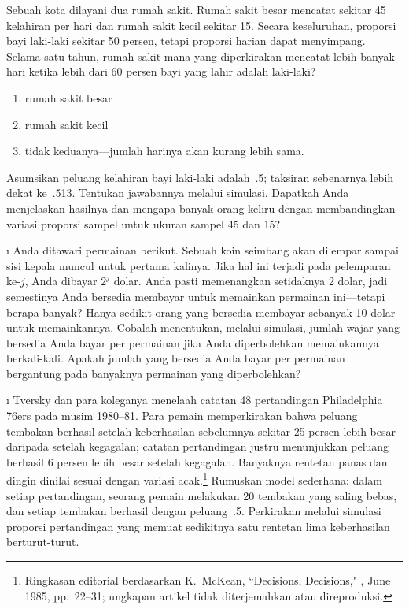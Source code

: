 \begin{LJSItem}
Sebuah kota dilayani dua rumah sakit. Rumah sakit besar mencatat
sekitar 45 kelahiran per hari dan rumah sakit kecil sekitar 15. Secara keseluruhan,
proporsi bayi laki-laki sekitar 50 persen, tetapi proporsi harian dapat menyimpang.
Selama satu tahun, rumah sakit mana yang diperkirakan mencatat lebih banyak hari ketika
lebih dari 60 persen bayi yang lahir adalah laki-laki?
\begin{enumerate}
\item rumah sakit besar
\item rumah sakit kecil
\item tidak keduanya---jumlah harinya akan kurang lebih sama.
\end{enumerate}

Asumsikan peluang kelahiran bayi laki-laki adalah~.5; taksiran sebenarnya lebih dekat
ke~.513. Tentukan jawabannya melalui simulasi. Dapatkah Anda menjelaskan hasilnya
dan mengapa banyak orang keliru dengan membandingkan variasi proporsi sampel
untuk ukuran sampel 45 dan 15?

\i\label{exer 1.1.14} Anda ditawari permainan berikut.  Sebuah koin seimbang akan
dilempar sampai
sisi kepala muncul untuk pertama kalinya.  Jika hal ini terjadi pada pelemparan ke-$j$, Anda dibayar
$2^j$ dolar.  Anda pasti memenangkan setidaknya 2 dolar, jadi semestinya Anda
bersedia
membayar untuk memainkan permainan ini---tetapi berapa banyak?  Hanya sedikit orang yang bersedia membayar sebanyak 10
dolar untuk memainkannya.  Cobalah menentukan, melalui simulasi, jumlah
wajar
yang bersedia Anda bayar per permainan jika Anda diperbolehkan
memainkannya berkali-kali.
Apakah jumlah yang bersedia Anda bayar per permainan bergantung pada
banyaknya permainan yang diperbolehkan?

\i\label{exer 1.1.15} Tversky dan para koleganya menelaah catatan 48 pertandingan
Philadelphia 76ers pada musim 1980--81. Para pemain
memperkirakan bahwa peluang tembakan berhasil setelah keberhasilan sebelumnya sekitar
25 persen lebih besar daripada setelah kegagalan; catatan pertandingan justru menunjukkan
peluang berhasil 6 persen lebih besar setelah kegagalan. Banyaknya rentetan panas dan dingin
dinilai sesuai dengan variasi acak.\footnote{Ringkasan editorial berdasarkan K.~McKean,
``Decisions, Decisions," , June 1985, pp.~22--31; ungkapan artikel tidak
diterjemahkan atau direproduksi.} Rumuskan model sederhana: dalam setiap pertandingan,
seorang pemain melakukan 20 tembakan yang saling bebas, dan setiap tembakan berhasil dengan
peluang~.5. Perkirakan melalui simulasi proporsi pertandingan yang memuat sedikitnya satu
rentetan lima keberhasilan berturut-turut.


\end{LJSItem}

